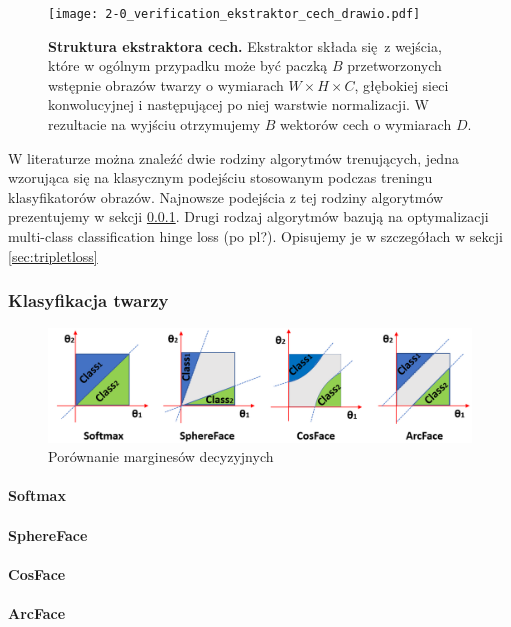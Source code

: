 \begin{figure}[h]
    \centering
    \texttt{[image: 2-0\_verification\_ekstraktor\_cech\_drawio.pdf]}
    \caption{\textbf{Struktura ekstraktora cech.} Ekstraktor składa się z wejścia, które w ogólnym przypadku może być paczką \(B\) przetworzonych wstępnie obrazów twarzy o wymiarach \( W \times H \times C\), głębokiej sieci konwolucyjnej i następującej po niej warstwie normalizacji. W rezultacie na wyjściu otrzymujemy \(B\) wektorów cech o wymiarach \(D\).}
    \label{fig:ekstraktor_cech}
\end{figure}


W literaturze można znaleźć dwie rodziny algorytmów trenujących, jedna wzorująca się na
klasycznym podejściu stosowanym podczas treningu klasyfikatorów obrazów. Najnowsze podejścia z
tej rodziny algorytmów prezentujemy w sekcji \ref{sec:klasyfikatory}. Drugi rodzaj algorytmów
bazują na optymalizacji multi-class classification hinge loss (po pl?). Opisujemy je w
szczegółach w sekcji \ref{sec:tripletloss}

\subsubsection{Klasyfikacja twarzy}\label{sec:klasyfikatory}
\begin{figure}[h!]
\centering
\includegraphics[width=1\linewidth]{img/margincompare.png}
\caption{Porównanie marginesów decyzyjnych\cite{}}
\vspace{-4mm}
\label{fig:binarymargin}
\end{figure}
\paragraph{Softmax\cite{Centreloss}}
\paragraph{SphereFace}
\paragraph{CosFace\cite{Cosface}}
\paragraph{ArcFace\cite{Arcface}}


